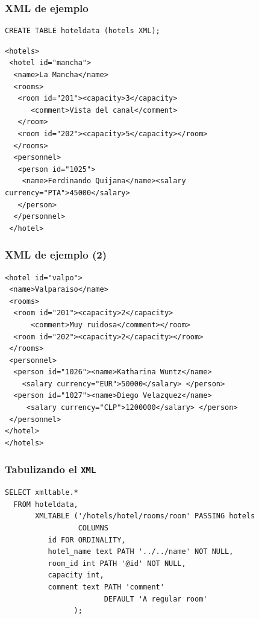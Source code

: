 \begin{frame}[fragile]
\frametitle{XML de ejemplo}
\footnotesize
\begin{lstlisting}
CREATE TABLE hoteldata (hotels XML);
\end{lstlisting}
\lstset{language=XML}
\begin{lstlisting}
<hotels>
 <hotel id="mancha">
  <name>La Mancha</name>
  <rooms>
   <room id="201"><capacity>3</capacity>
      <comment>Vista del canal</comment>
   </room>
   <room id="202"><capacity>5</capacity></room>
  </rooms>
  <personnel>
   <person id="1025">
    <name>Ferdinando Quijana</name><salary currency="PTA">45000</salary>
   </person>
  </personnel>
 </hotel>
\end{lstlisting}
\end{frame}

\begin{frame}[fragile]
\frametitle{XML de ejemplo (2)}
\footnotesize
\lstset{language=XML}
\begin{lstlisting}
<hotel id="valpo">
 <name>Valparaiso</name>
 <rooms>
  <room id="201"><capacity>2</capacity>
      <comment>Muy ruidosa</comment></room>
  <room id="202"><capacity>2</capacity></room>
 </rooms>
 <personnel>
  <person id="1026"><name>Katharina Wuntz</name>
    <salary currency="EUR">50000</salary> </person>
  <person id="1027"><name>Diego Velazquez</name>
     <salary currency="CLP">1200000</salary> </person>
 </personnel>
</hotel>
</hotels>
\end{lstlisting}

\end{frame}

\begin{frame}[fragile]
\frametitle{Tabulizando el \texttt{XML}}
\lstset{language=SQL}
\begin{lstlisting}
SELECT xmltable.*
  FROM hoteldata,
       XMLTABLE ('/hotels/hotel/rooms/room' PASSING hotels
                 COLUMNS
          id FOR ORDINALITY,
          hotel_name text PATH '../../name' NOT NULL,
          room_id int PATH '@id' NOT NULL,
          capacity int,
          comment text PATH 'comment'
                       DEFAULT 'A regular room'
                );
\end{lstlisting}
\end{frame}

